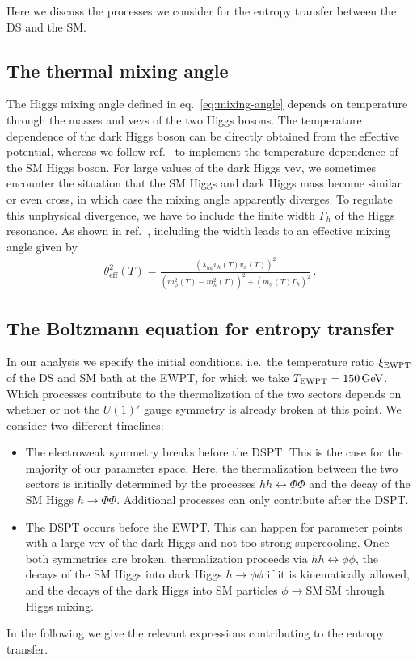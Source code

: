Here we discuss the processes we consider for the entropy transfer between the \ac{DS} and the \ac{SM}.

\subsection{The thermal mixing angle}

The Higgs mixing angle defined in eq.~\eqref{eq:mixing-angle} depends on temperature through the masses and \acp{vev} of the two Higgs bosons. The temperature dependence of the dark Higgs boson can be directly obtained from the effective potential, whereas we follow ref.~\cite{Bringmann:2021sth} to implement the  temperature dependence of the \ac{SM} Higgs boson. For large values of the dark Higgs \ac{vev}, we sometimes encounter the situation that the \ac{SM} Higgs and dark Higgs mass become similar or even cross, in which case the mixing angle apparently diverges. To regulate this unphysical divergence, we have to include the finite width $\Gamma_{h}$ of the Higgs resonance. As shown in ref.~\cite{Fradette:2018hhl}, including the width leads to an effective mixing angle given by 
\begin{align}
	\theta_{\mathrm{eff}}^2(T) = \frac{\left(\lambda_{h\phi} v_{h}(T)v_{\phi}(T) \right)^2}{(m_{\phi}^2(T) -
		m_{h}^2(T))^2 + (m_{\phi}(T)\Gamma_{h})^2} \,.
\end{align}


\subsection{The Boltzmann equation for entropy transfer}

In our analysis we specify the initial conditions, i.e.~the temperature ratio $\xi_{\text{EWPT}}$ of the \ac{DS} and \ac{SM} bath at the \ac{EWPT}, for which we take $T_{\text{EWPT}} = 150\,\text{GeV}$.  Which processes contribute to the thermalization of the two sectors depends on whether or not the $U(1)'$ gauge symmetry is already broken at this point. We consider two different timelines:
\begin{itemize}
	\item The electroweak symmetry breaks before the \ac{DSPT}. This is the case for the majority of our parameter space. Here, the thermalization between the two sectors is initially determined by the processes $h h \leftrightarrow \Phi\Phi$ and the decay of the \ac{SM} Higgs $h \rightarrow \Phi\Phi$. Additional processes can only contribute after the \ac{DSPT}.
	\item The \ac{DSPT} occurs before the \ac{EWPT}. This can happen for parameter points with a large \ac{vev} of the dark Higgs and not too strong supercooling. Once both symmetries are broken, thermalization proceeds via $hh \leftrightarrow \phi\phi$, the decays of the \ac{SM} Higgs into dark Higgs $h \rightarrow \phi\phi$ if it is kinematically allowed, and the decays of the dark Higgs into \ac{SM} particles $\phi \rightarrow \mathrm{SM} \ \mathrm{SM}$ through Higgs mixing.
\end{itemize}
In the following we give the relevant expressions contributing to the entropy transfer.

